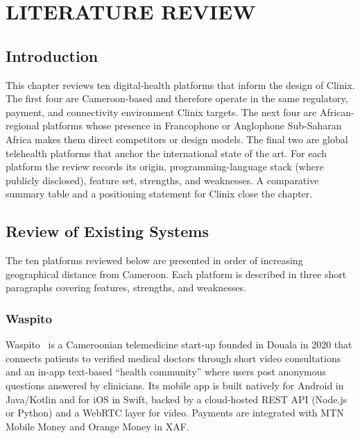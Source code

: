 \chapter{LITERATURE REVIEW}

\section{Introduction}

This chapter reviews ten digital-health platforms that inform the design of Clinix. The first four are Cameroon-based and therefore operate in the same regulatory, payment, and connectivity environment Clinix targets. The next four are African-regional platforms whose presence in Francophone or Anglophone Sub-Saharan Africa makes them direct competitors or design models. The final two are global telehealth platforms that anchor the international state of the art. For each platform the review records its origin, programming-language stack (where publicly disclosed), feature set, strengths, and weaknesses. A comparative summary table and a positioning statement for Clinix close the chapter.

\section{Review of Existing Systems}

The ten platforms reviewed below are presented in order of increasing geographical distance from Cameroon. Each platform is described in three short paragraphs covering features, strengths, and weaknesses.

\subsection{Waspito}

Waspito~\cite{waspito} is a Cameroonian telemedicine start-up founded in Douala in 2020 that connects patients to verified medical doctors through short video consultations and an in-app text-based ``health community'' where users post anonymous questions answered by clinicians. Its mobile app is built natively for Android in Java/Kotlin and for iOS in Swift, backed by a cloud-hosted REST API (Node.js or Python) and a WebRTC layer for video. Payments are integrated with MTN Mobile Money and Orange Money in XAF.

